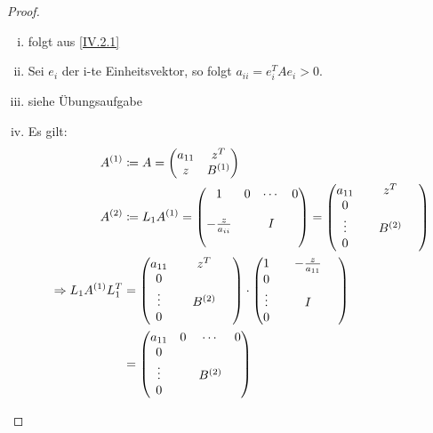 \documentclass[ngerman,fontsize=11pt, paper=a4, parskip=half, titlepage=true, toc=bib]{scrbook}
\begin{document}
\begin{proof}~\\
\begin{enumerate}[i)]
	\item folgt aus \eqref{IV.2.1}
	\item Sei $e_i$ der i-te Einheitsvektor, so folgt $a_{ii} = e_{i}^TAe_i > 0$.
	\item siehe Übungsaufgabe
	\item Es gilt:
			\begin{align*}
				A^{(1)} &\coloneqq A = \begin{pmatrix}
															a_{11} & z^T \\ 
															z			& B^{(1)}
														\end{pmatrix} \\
				A^{(2)}	&\coloneqq L_1 A^{(1)} 
								= \begin{pmatrix}
											1 & 0 & \dotsm & 0 \\ \\
											-\frac{z}{a_{ii}} && I \\ ~
										\end{pmatrix} 
								= \begin{pmatrix}
											a_{11} &  & z^T & ~ \\ 
											0 \\
											\vdots && B^{(2)} \\ 
											0
										\end{pmatrix} \\
				\Rightarrow L_1A^{(1)}L_1^T  
				&= \begin{pmatrix}
							a_{11} &  & z^T & ~ \\ 
							0 \\
							\vdots && B^{(2)} \\ 
							0
						\end{pmatrix} 
						\cdot  \begin{pmatrix}
										1 &  &	-\frac{z}{a_{11}} & ~ \\ 
										0 \\\nocite{*}
										\vdots && I \\ 
										0
									\end{pmatrix}\\
				&= \begin{pmatrix}
							a_{11} & 0 & \cdots & 0\\ 
							0 \\
							\vdots && B^{(2)} \\ 
							0

\end{pmatrix}
\end{align*}
\end{enumerate}
\end{proof}
\end{document}

